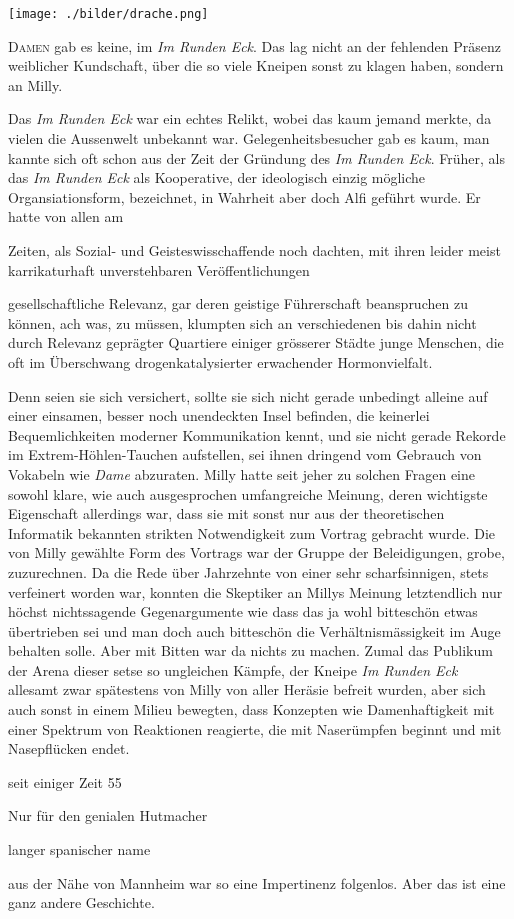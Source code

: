 ﻿\thispagestyle{empty}
\begin{center}
\texttt{[image: ./bilder/drache.png]}
\end{center}
\vspace*{\fill}
{\centering\fontsize{50}{48} \color{farbe}\par}
\newpage
\lettrine[lines=3, lhang=.2, loversize=.25, lraise=0.05, findent=0.1em,
nindent=0em]{D}{amen} gab es keine, im \textit{Im Runden Eck}. Das lag nicht an der fehlenden Präsenz weiblicher Kundschaft, über die so viele Kneipen sonst zu klagen haben, sondern an Milly.

Das \textit{Im Runden Eck} war ein echtes Relikt, wobei das kaum jemand merkte, da vielen die Aussenwelt unbekannt war. Gelegenheitsbesucher gab es kaum, man kannte sich oft schon aus der Zeit der Gründung des \textit{Im Runden Eck}. Früher, als das \textit{Im Runden Eck} als Kooperative, der ideologisch einzig mögliche Organsiationsform, bezeichnet, in Wahrheit aber doch Alfi geführt wurde. Er hatte von allen am

Zeiten, als Sozial- und Geisteswisschaffende noch dachten, mit ihren leider meist karrikaturhaft unverstehbaren Veröffentlichungen 

gesellschaftliche Relevanz, gar deren geistige Führerschaft beanspruchen zu können, ach was, zu müssen, klumpten sich an verschiedenen bis dahin nicht durch Relevanz geprägter Quartiere einiger grösserer Städte junge Menschen, die oft im Überschwang drogenkatalysierter erwachender Hormonvielfalt.

Denn seien sie sich versichert, sollte sie sich nicht gerade unbedingt alleine auf einer einsamen, besser noch unendeckten Insel befinden, die keinerlei Bequemlichkeiten moderner Kommunikation kennt, und sie nicht gerade Rekorde im Extrem-Höhlen-Tauchen aufstellen, sei ihnen dringend vom Gebrauch von Vokabeln wie \textit{Dame} abzuraten. Milly hatte seit jeher zu solchen Fragen eine sowohl klare, wie auch ausgesprochen umfangreiche Meinung, deren wichtigste Eigenschaft allerdings war, dass sie mit sonst nur aus der theoretischen Informatik bekannten strikten Notwendigkeit zum Vortrag gebracht wurde. Die von Milly gewählte Form des Vortrags war der Gruppe der Beleidigungen, grobe, zuzurechnen. Da die Rede über Jahrzehnte von einer sehr scharfsinnigen, stets verfeinert worden war, konnten die Skeptiker an Millys Meinung letztendlich nur höchst nichtssagende Gegenargumente wie dass das ja wohl bitteschön etwas übertrieben sei und man doch auch bitteschön die Verhältnismässigkeit im Auge behalten solle. Aber mit Bitten war da nichts zu machen. Zumal das Publikum der Arena dieser setse so ungleichen Kämpfe, der Kneipe \textit{Im Runden Eck} allesamt zwar spätestens von Milly von aller Heräsie befreit wurden, aber sich auch sonst in einem Milieu bewegten, dass Konzepten wie Damenhaftigkeit mit einer Spektrum von Reaktionen reagierte, die mit Naserümpfen beginnt und mit Nasepflücken endet.


seit einiger Zeit 55


Nur für den genialen Hutmacher 

langer spanischer name

aus der Nähe von Mannheim war so eine Impertinenz folgenlos. Aber das ist eine ganz andere Geschichte.


\hfill {}

\newpage
 

